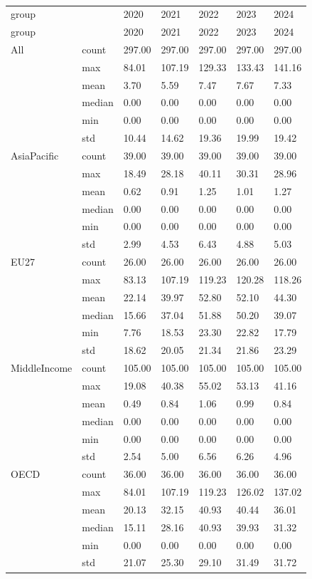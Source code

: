 \documentclass[
  letterpaper,
  DIV=11,
  numbers=noendperiod]{scrartcl}
\begin{document}
\begin{longtable}[]{@{}lllllll@{}}

\caption{\label{tbl-summary}Summary statistics for 2020-2024}

\tabularnewline

\caption{}\label{T_a07a4}\tabularnewline
\toprule\noalign{}
group & & 2020 & 2021 & 2022 & 2023 & 2024 \\
\midrule\noalign{}
\endfirsthead
\toprule\noalign{}
group & & 2020 & 2021 & 2022 & 2023 & 2024 \\
\midrule\noalign{}
\endhead
\bottomrule\noalign{}
\endlastfoot
All & count & 297.00 & 297.00 & 297.00 & 297.00 & 297.00 \\
& max & 84.01 & 107.19 & 129.33 & 133.43 & 141.16 \\
& mean & 3.70 & 5.59 & 7.47 & 7.67 & 7.33 \\
& median & 0.00 & 0.00 & 0.00 & 0.00 & 0.00 \\
& min & 0.00 & 0.00 & 0.00 & 0.00 & 0.00 \\
& std & 10.44 & 14.62 & 19.36 & 19.99 & 19.42 \\
AsiaPacific & count & 39.00 & 39.00 & 39.00 & 39.00 & 39.00 \\
& max & 18.49 & 28.18 & 40.11 & 30.31 & 28.96 \\
& mean & 0.62 & 0.91 & 1.25 & 1.01 & 1.27 \\
& median & 0.00 & 0.00 & 0.00 & 0.00 & 0.00 \\
& min & 0.00 & 0.00 & 0.00 & 0.00 & 0.00 \\
& std & 2.99 & 4.53 & 6.43 & 4.88 & 5.03 \\
EU27 & count & 26.00 & 26.00 & 26.00 & 26.00 & 26.00 \\
& max & 83.13 & 107.19 & 119.23 & 120.28 & 118.26 \\
& mean & 22.14 & 39.97 & 52.80 & 52.10 & 44.30 \\
& median & 15.66 & 37.04 & 51.88 & 50.20 & 39.07 \\
& min & 7.76 & 18.53 & 23.30 & 22.82 & 17.79 \\
& std & 18.62 & 20.05 & 21.34 & 21.86 & 23.29 \\
MiddleIncome & count & 105.00 & 105.00 & 105.00 & 105.00 & 105.00 \\
& max & 19.08 & 40.38 & 55.02 & 53.13 & 41.16 \\
& mean & 0.49 & 0.84 & 1.06 & 0.99 & 0.84 \\
& median & 0.00 & 0.00 & 0.00 & 0.00 & 0.00 \\
& min & 0.00 & 0.00 & 0.00 & 0.00 & 0.00 \\
& std & 2.54 & 5.00 & 6.56 & 6.26 & 4.96 \\
OECD & count & 36.00 & 36.00 & 36.00 & 36.00 & 36.00 \\
& max & 84.01 & 107.19 & 119.23 & 126.02 & 137.02 \\
& mean & 20.13 & 32.15 & 40.93 & 40.44 & 36.01 \\
& median & 15.11 & 28.16 & 40.93 & 39.93 & 31.32 \\
& min & 0.00 & 0.00 & 0.00 & 0.00 & 0.00 \\
& std & 21.07 & 25.30 & 29.10 & 31.49 & 31.72 \\


\end{longtable}
\end{document}
